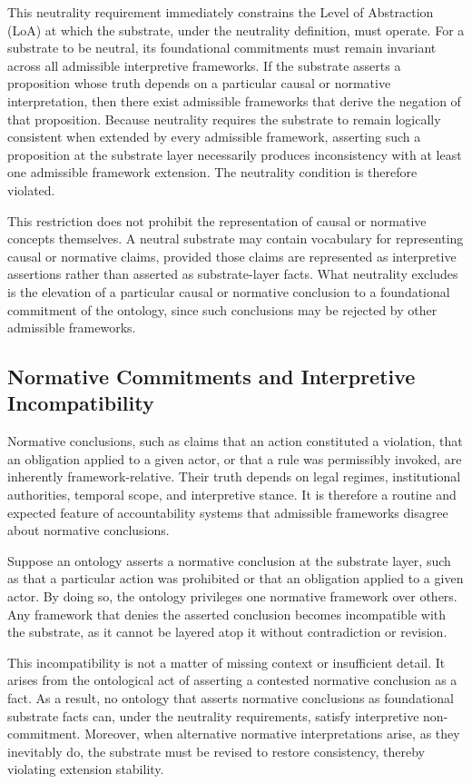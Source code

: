 This neutrality requirement immediately constrains
the Level of Abstraction (LoA)
at which the substrate,
under the neutrality definition,
must operate.
For a substrate to be neutral,
its foundational commitments must remain invariant
across all admissible interpretive frameworks.
If the substrate asserts a proposition whose truth
depends on a particular causal or normative interpretation,
then there exist admissible frameworks that derive the negation of that proposition.
Because neutrality requires the substrate to remain logically
consistent when extended by every admissible framework,
asserting such a proposition at the substrate layer
necessarily produces inconsistency with
at least one admissible framework extension.
The neutrality condition is therefore violated.

This restriction does not prohibit the representation of
causal or normative concepts themselves.
A neutral substrate may contain vocabulary for representing
causal or normative claims, provided those claims are represented as
interpretive assertions rather than asserted as substrate-layer facts.
What neutrality excludes is the elevation of a particular
causal or normative conclusion to a foundational commitment of the ontology,
since such conclusions may be rejected by other admissible frameworks.

\subsection{Normative Commitments and Interpretive Incompatibility}
\label{subsec:normative}

Normative conclusions, such as claims that
an action constituted a violation,
that an obligation applied to a given actor,
or that a rule was permissibly invoked,
are inherently framework-relative.
Their truth depends on legal regimes, institutional authorities,
temporal scope, and interpretive stance.
It is therefore a routine and expected feature
of accountability systems
that admissible frameworks disagree about normative conclusions.

Suppose an ontology asserts a normative conclusion at the substrate layer,
such as that a particular action was prohibited or
that an obligation applied to a given actor.
By doing so, the ontology privileges one normative framework over others.
Any framework that denies the asserted conclusion becomes
incompatible with the substrate,
as it cannot be layered atop it
without contradiction or revision.

This incompatibility is not a matter of
missing context or insufficient detail.
It arises from the ontological act of
asserting a contested normative conclusion as a fact.
As a result, no ontology that asserts normative conclusions
as foundational substrate facts
can, under the neutrality requirements,
satisfy interpretive non-commitment.
Moreover, when alternative normative interpretations arise,
as they inevitably do,
the substrate must be revised to restore consistency,
thereby violating extension stability.

